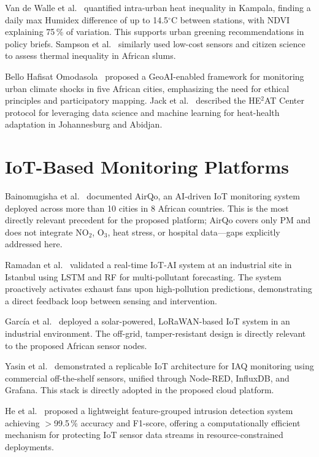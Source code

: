 \documentclass[12pt,a4paper]{report}
\begin{document}
Van de Walle et al.~\cite{vandewalle2021} quantified intra-urban heat inequality in Kampala, finding a daily max Humidex difference of up to 14.5$^\circ$C between stations, with NDVI explaining 75\,\% of variation. This supports urban greening recommendations in policy briefs. Sampson et al.~\cite{Sally_Ama_Sampson_2025} similarly used low-cost sensors and citizen science to assess thermal inequality in African slums.

Bello Hafisat Omodasola~\cite{Bello_Hafisat_Omodasola_2025} proposed a GeoAI-enabled framework for monitoring urban climate shocks in five African cities, emphasizing the need for ethical principles and participatory mapping. Jack et al.~\cite{Christopher_Jack_2024} described the HE$^2$AT Center protocol for leveraging data science and machine learning for heat-health adaptation in Johannesburg and Abidjan.

\section{IoT-Based Monitoring Platforms}
Bainomugisha et al.~\cite{bainomugisha2024} documented AirQo, an AI-driven IoT monitoring system deployed across more than 10 cities in 8 African countries. This is the most directly relevant precedent for the proposed platform; AirQo covers only PM and does not integrate NO$_2$, O$_3$, heat stress, or hospital data—gaps explicitly addressed here.

Ramadan et al.~\cite{ramadan2024} validated a real-time IoT-AI system at an industrial site in Istanbul using LSTM and RF for multi-pollutant forecasting. The system proactively activates exhaust fans upon high-pollution predictions, demonstrating a direct feedback loop between sensing and intervention.

Garc{\'i}a et al.~\cite{garcia2022smart} deployed a solar-powered, LoRaWAN-based IoT system in an industrial environment. The off-grid, tamper-resistant design is directly relevant to the proposed African sensor nodes.

Yasin et al.~\cite{yasin2022} demonstrated a replicable IoT architecture for IAQ monitoring using commercial off-the-shelf sensors, unified through Node-RED, InfluxDB, and Grafana. This stack is directly adopted in the proposed cloud platform.

He et al.~\cite{he2024} proposed a lightweight feature-grouped intrusion detection system achieving $>$99.5\,\% accuracy and F1-score, offering a computationally efficient mechanism for protecting IoT sensor data streams in resource-constrained deployments.
\end{document}
